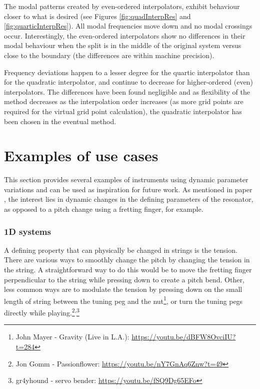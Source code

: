The modal patterns created by even-ordered interpolators, exhibit behaviour closer to what is desired (see Figures \ref{fig:quadInterpRes} and \ref{fig:quarticInterpRes}). All modal frequencies move down and no modal crossings occur. Interestingly, the even-ordered interpolators show no differences in their modal behaviour when the split is in the middle of the original system versus close to the boundary (the differences are within machine precision).

Frequency deviations happen to a lesser degree for the quartic interpolator than for the quadratic interpolator, and continue to decrease for higher-ordered (even) interpolators. The differences have been found negligible and as flexibility of the method decreases as the interpolation order increases (as more grid points are required for the virtual grid point calculation), the quadratic interpolator has been chosen in the eventual method. 


\section{Examples of use cases}\label{sec:examples}
This section provides several examples of instruments using dynamic parameter variations and can be used as inspiration for future work. As mentioned in paper \citeP[G], the interest lies in dynamic changes in the defining parameters of the resonator, as opposed to a pitch change using a fretting finger, for example. 


\subsubsection{1D systems}
A defining property that can physically be changed in strings is the tension. 
There are various ways to smoothly change the pitch by changing the tension in the string. A straightforward way to do this would be to move the fretting finger perpendicular to the string while pressing down to create a pitch bend. Other, less common ways are to modulate the tension by pressing down on the small length of string between the tuning peg and the nut\footnote{John Mayer - Gravity (Live in L.A.): \url{https://youtu.be/dBFW8OvciIU?t=284}}, or turn the tuning pegs directly while playing.\footnote{Jon Gomm - Passionflower: \url{https://youtu.be/nY7GnAq6Znw?t=49}}\textsuperscript{,}\footnote{gr4yhound - servo bender: \url{https://youtu.be/fSQ9Dg65EFo}}

